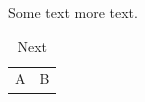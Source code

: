 \documentclass[manuscript]{aastex}
\begin{document}
Some text  more text.
\begin{table}
\caption{Next}
\begin{tabular}{cc} A & B \\ \end{tabular}
\end{table}
\end{document}
